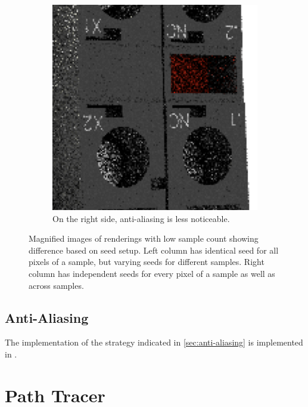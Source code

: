 \begin{figure}[H]
\begin{subfigure}[t]{0.3\textwidth}
        \includegraphics[width=\textwidth]{resources/good-seed-anti-aliasing.png}
        \caption{On the right side, anti-aliasing is less noticeable.}
        \label{fig:rngNoiseArtifactsHighlightsGoodAnti}
    \end{subfigure}
    \hspace*{2cm}
    \caption{Magnified images of renderings with low sample count showing difference based on seed setup. Left column has identical seed for all pixels of a sample, but varying seeds for different samples. Right column has independent seeds for every pixel of a sample as well as across samples.}
    \label{fig:rngNoiseArtifactsHighlights}
\end{figure}

\subsection*{Anti-Aliasing}
\label{sec:anti-aliasing-implementation}

The implementation of the strategy indicated in \ref{sec:anti-aliasing} is implemented in .

\section{Path Tracer}

